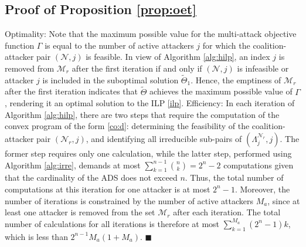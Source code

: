 \documentclass[journal]{IEEEtran}
\newenvironment{Proof}{\noindent{\em Proof:\/}}{\hfill $\blacksquare$\par}
\newcommand{\N}{\mathcal{N}}
\newcommand{\M}{\mathcal{M}}
\newcommand{\1}{\mathbf{1}}
\begin{document}
\subsection{Proof of Proposition \ref{prop:oet}}\label{proof:oet}

\begin{Proof}
Optimality: Note that the maximum possible value for the multi-attack objective function $\Gamma$ is equal to the number of active attackers $j$ for which the coalition-attacker pair $(\N,j)$ is feasible. In view of Algorithm \ref{alg:hilp}, an index $j$ is removed from $\M_r$ after the first iteration if and only if $(\N,j)$ is infeasible or attacker $j$ is included in the suboptimal solution $\tilde{\Theta}_1$. Hence, the emptiness of $\M_r$ after the first iteration indicates that $\tilde{\Theta}$ achieves the maximum possible value of $\Gamma$, rendering it an optimal solution to the ILP \eqref{ilp}. 
Efficiency: In each iteration of Algorithm \ref{alg:hilp}, there are two steps that require the computation of the convex program of the form \eqref{co:d}: determining the feasibility of the coalition-attacker pair $(\N_r,j)$, and identifying all irreducible sub-pairs of $(\Lambda^{\N_r}_j,j)$. The former step requires only one calculation, while the latter step, performed using Algorithm \ref{alg:irre}, demands at most $\sum_{k=1}^{n-1}\binom{n}{k}=2^{n}-2$ computations given that the cardinality of the ADS does not exceed $n$. Thus, the total number of computations at this iteration for one attacker is at most $2^n-1$. Moreover, the number of iterations is constrained by the number of active attackers $M_a$, since at least one attacker is removed from the set $\M_r$ after each iteration. The total number of calculations for all iterations is therefore at most $\sum_{k=1}^{M_a}(2^n-1)k$, which is less than $2^{n-1}M_a(1+M_a)$.
\end{Proof}



\end{document}
